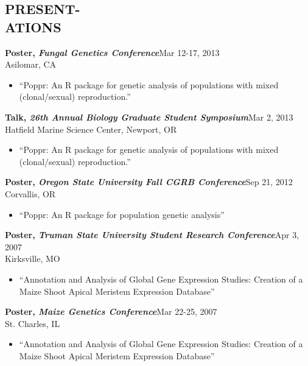 \documentclass[margin, 10pt]{res} %
\begin{document}
\begin{resume}

\section{PRESENT-\\ATIONS}

{\bf Poster, \sl Fungal Genetics Conference}\hfill Mar 12-17, 2013\\
Asilomar, CA
\begin{itemize} \itemsep -2pt
\item ``Poppr: An R package for genetic analysis of populations with mixed \\(clonal/sexual) reproduction.''
\end{itemize}
\newpage

%
{\bf Talk, \sl 26th Annual Biology Graduate Student Symposium}\hfill Mar 2, 2013\\
Hatfield Marine Science Center, Newport, OR
\begin{itemize} \itemsep -2pt
\item ``Poppr: An R package for genetic analysis of populations with mixed \\(clonal/sexual) reproduction.''
\end{itemize}

{\bf Poster, \sl Oregon State University Fall CGRB Conference}\hfill Sep 21, 2012\\
Corvallis, OR
\begin{itemize} \itemsep -2pt
\item ``Poppr: An R package for population genetic analysis''
\end{itemize}

{\bf Poster, \sl Truman State University Student Research Conference}\hfill Apr 3, 2007\\
Kirksville, MO
\begin{itemize} \itemsep -2pt
\item ``Annotation and Analysis of Global Gene Expression Studies: Creation of a Maize Shoot Apical Meristem Expression Database''
\end{itemize}

{\bf Poster, \sl Maize Genetics Conference}\hfill Mar 22-25, 2007\\
St. Charles, IL
\begin{itemize} \itemsep -2pt
\item ``Annotation and Analysis of Global Gene Expression Studies: Creation of a Maize Shoot Apical Meristem Expression Database''
\end{itemize}



\end{resume}
\end{document}
